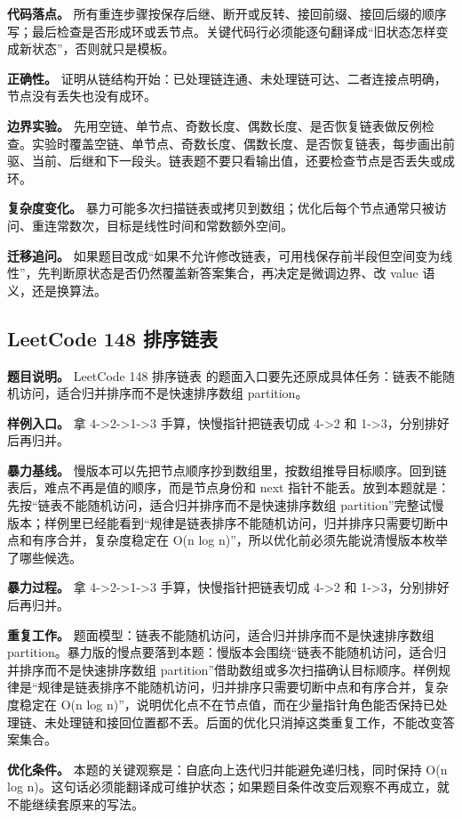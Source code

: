 \textbf{代码落点。} 所有重连步骤按保存后继、断开或反转、接回前缀、接回后缀的顺序写；最后检查是否形成环或丢节点。关键代码行必须能逐句翻译成“旧状态怎样变成新状态”，否则就只是模板。

\textbf{正确性。} 证明从链结构开始：已处理链连通、未处理链可达、二者连接点明确，节点没有丢失也没有成环。

\textbf{边界实验。} 先用空链、单节点、奇数长度、偶数长度、是否恢复链表做反例检查。实验时覆盖空链、单节点、奇数长度、偶数长度、是否恢复链表，每步画出前驱、当前、后继和下一段头。链表题不要只看输出值，还要检查节点是否丢失或成环。

\textbf{复杂度变化。} 暴力可能多次扫描链表或拷贝到数组；优化后每个节点通常只被访问、重连常数次，目标是线性时间和常数额外空间。

\textbf{迁移追问。} 如果题目改成“如果不允许修改链表，可用栈保存前半段但空间变为线性”，先判断原状态是否仍然覆盖新答案集合，再决定是微调边界、改 value 语义，还是换算法。

\subsection{LeetCode 148 排序链表}

\textbf{题目说明。} LeetCode 148 排序链表 的题面入口要先还原成具体任务：链表不能随机访问，适合归并排序而不是快速排序数组 partition。

\textbf{样例入口。} 拿 4->2->1->3 手算，快慢指针把链表切成 4->2 和 1->3，分别排好后再归并。

\textbf{暴力基线。} 慢版本可以先把节点顺序抄到数组里，按数组推导目标顺序。回到链表后，难点不再是值的顺序，而是节点身份和 next 指针不能丢。放到本题就是：先按“链表不能随机访问，适合归并排序而不是快速排序数组 partition”完整试慢版本；样例里已经能看到“规律是链表排序不能随机访问，归并排序只需要切断中点和有序合并，复杂度稳定在 O(n log n)”，所以优化前必须先能说清慢版本枚举了哪些候选。

\textbf{暴力过程。} 拿 4->2->1->3 手算，快慢指针把链表切成 4->2 和 1->3，分别排好后再归并。

\textbf{重复工作。} 题面模型：链表不能随机访问，适合归并排序而不是快速排序数组 partition。暴力版的慢点要落到本题：慢版本会围绕“链表不能随机访问，适合归并排序而不是快速排序数组 partition”借助数组或多次扫描确认目标顺序。样例规律是“规律是链表排序不能随机访问，归并排序只需要切断中点和有序合并，复杂度稳定在 O(n log n)”，说明优化点不在节点值，而在少量指针角色能否保持已处理链、未处理链和接回位置都不丢。后面的优化只消掉这类重复工作，不能改变答案集合。

\textbf{优化条件。} 本题的关键观察是：自底向上迭代归并能避免递归栈，同时保持 O(n log n)。这句话必须能翻译成可维护状态；如果题目条件改变后观察不再成立，就不能继续套原来的写法。

